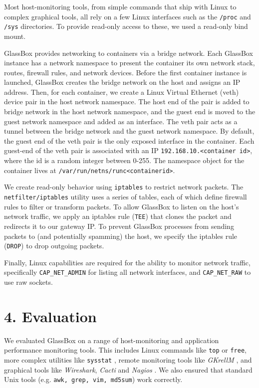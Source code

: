 \documentclass{proc}
\begin{document}
Most host-monitoring tools, from simple commands that ship with Linux to complex graphical tools, all rely on a few Linux interfaces such as the \texttt{/proc} and \texttt{/sys} directories. To provide read-only access to these, we used a read-only bind mount. %

GlassBox provides networking to containers via a bridge network. Each GlassBox instance has a network namespace to present the container its own network stack, routes, firewall rules, and network devices. Before the first container instance is launched, GlassBox creates the bridge network on the host and assigns an IP address. Then, for each container, we create a Linux Virtual Ethernet (veth) device pair in the host network namespace. The host end of the pair is added to bridge network in the host network namespace, and the guest end is moved to the guest network namespace and added as an interface. The veth pair acts as a tunnel between the bridge network and the guest network namespace. By default, the guest end of the veth pair is the only exposed interface in the container. Each guest-end of the veth pair is associated with an IP \texttt{192.168.10.<container id>}, where the id is a random integer between 0-255. The namespace object for the container lives at \texttt{/var/run/netns/runc<containerid>}. 

We create read-only behavior using \texttt{iptables} to restrict network packets. The \texttt{netfilter/iptables} utility uses a series of tables, each of which define firewall rules to filter or transform packets. To allow GlassBox to listen on the host's network traffic, we apply an iptables rule (\texttt{TEE}) that clones the packet and redirects it to our gateway IP. To prevent GlassBox processes from sending packets to (and potentially spamming) the host, we specify the iptables rule (\texttt{DROP}) to drop outgoing packets. 

Finally, Linux capabilities are required for the ability to monitor network traffic, specifically \texttt{CAP\_NET\_ADMIN} for listing all network interfaces, and \texttt{CAP\_NET\_RAW} to use raw sockets.

\section*{4. Evaluation}

We evaluated GlassBox on a range of host-monitoring and application performance monitoring tools. This includes Linux commands like \texttt{top} or \texttt{free}, more complex utilities like \texttt{sysstat} \cite{sysstat}, remote monitoring tools like \textit{GKrellM} \cite{gkrellm}, and graphical tools like \textit{Wireshark}, \textit{Cacti} \cite{cacti} and \textit{Nagios} \cite{nagios}. We also ensured that standard Unix tools (e.g. \texttt{awk, grep, vim, md5sum}) work correctly.
\end{document}
